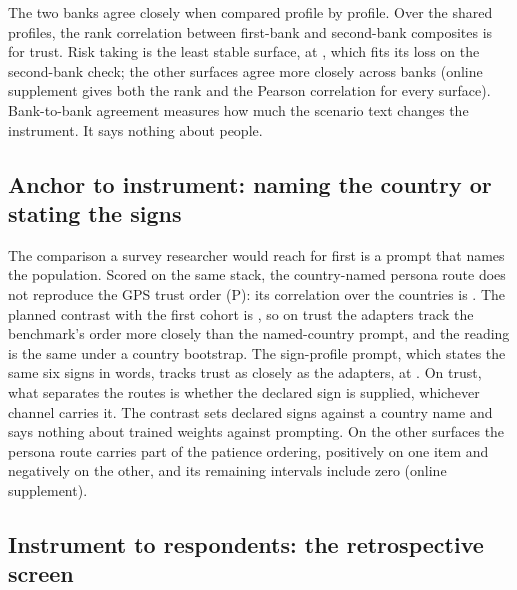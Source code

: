 The two banks agree closely when compared profile by profile. Over the  shared profiles, the rank correlation between first-bank and second-bank composites is   for trust. Risk taking is the least stable surface, at  , which fits its loss on the second-bank check; the other surfaces agree more closely across banks (online supplement gives both the rank and the Pearson correlation for every surface). Bank-to-bank agreement measures how much the scenario text changes the instrument. It says nothing about people.

\subsection{Anchor to instrument: naming the country or stating the signs}\label{sec:res-persona}

The comparison a survey researcher would reach for first is a prompt that names the population. Scored on the same stack, the country-named persona route does not reproduce the GPS trust order (P): its correlation over the  countries is  . The planned contrast with the first cohort is  , so on trust the adapters track the benchmark's order more closely than the named-country prompt, and the reading is the same under a country bootstrap. The sign-profile prompt, which states the same six signs in words, tracks trust as closely as the adapters, at  . On trust, what separates the routes is whether the declared sign is supplied, whichever channel carries it. The contrast sets declared signs against a country name and says nothing about trained weights against prompting. On the other surfaces the persona route carries part of the patience ordering, positively on one item and negatively on the other, and its remaining intervals include zero (online supplement).

\subsection{Instrument to respondents: the retrospective screen}\label{sec:res-screen}

